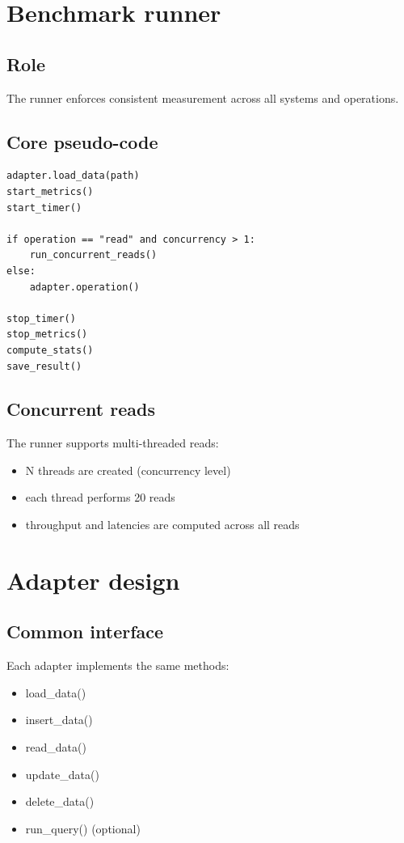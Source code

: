 \documentclass[12pt]{report}
\begin{document}
\chapter{Benchmark runner}
\section{Role}
The runner enforces consistent measurement across all systems and operations.

\section{Core pseudo-code}
\begin{lstlisting}[caption={Runner pseudo-code}]
adapter.load_data(path)
start_metrics()
start_timer()

if operation == "read" and concurrency > 1:
    run_concurrent_reads()
else:
    adapter.operation()

stop_timer()
stop_metrics()
compute_stats()
save_result()
\end{lstlisting}

\section{Concurrent reads}
The runner supports multi-threaded reads:
\begin{itemize}
  \item N threads are created (concurrency level)
  \item each thread performs 20 reads
  \item throughput and latencies are computed across all reads
\end{itemize}

\chapter{Adapter design}
\section{Common interface}
Each adapter implements the same methods:
\begin{itemize}
  \item load\_data()
  \item insert\_data()
  \item read\_data()
  \item update\_data()
  \item delete\_data()
  \item run\_query() (optional)
\end{itemize}
\end{document}
